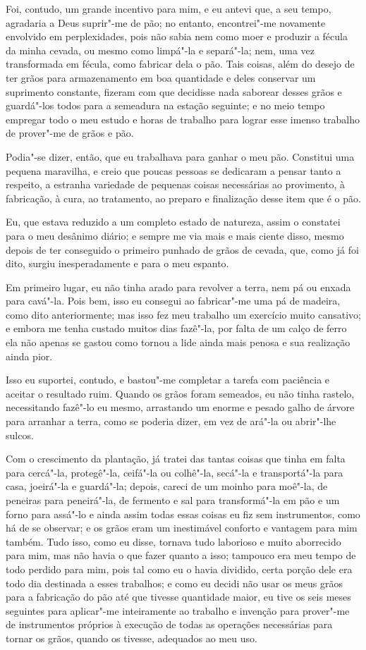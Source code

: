 Foi, contudo, um grande incentivo para mim, e eu antevi que, a seu
tempo, agradaria a Deus suprir"-me de pão; no entanto, encontrei"-me
novamente envolvido em perplexidades, pois não sabia nem como moer e
produzir a fécula da minha cevada, ou mesmo como limpá"-la e separá"-la;
nem, uma vez transformada em fécula, como fabricar dela o pão. Tais
coisas, além do desejo de ter grãos para armazenamento em boa quantidade
e deles conservar um suprimento constante, fizeram com que decidisse
nada saborear desses grãos e guardá"-los todos para a semeadura na
estação seguinte; e no meio tempo empregar todo o meu estudo e horas de
trabalho para lograr esse imenso trabalho de prover"-me de grãos e pão.

Podia"-se dizer, então, que eu trabalhava para ganhar o meu pão.
Constitui uma pequena maravilha, e creio que poucas pessoas se dedicaram
a pensar tanto a respeito, a estranha variedade de pequenas coisas
necessárias ao provimento, à fabricação, à cura, ao tratamento, ao
preparo e finalização desse item que é o pão.

Eu, que estava reduzido a um completo estado de natureza, assim o
constatei para o meu desânimo diário; e sempre me via mais e mais ciente
disso, mesmo depois de ter conseguido o primeiro punhado de grãos de
cevada, que, como já foi dito, surgiu inesperadamente e para o meu
espanto.

Em primeiro lugar, eu não tinha arado para revolver a terra, nem pá ou
enxada para cavá"-la. Pois bem, isso eu consegui ao fabricar"-me uma pá de
madeira, como dito anteriormente; mas isso fez meu trabalho um exercício
muito cansativo; e embora me tenha custado muitos dias fazê"-la, por
falta de um calço de ferro ela não apenas se gastou como tornou a lide
ainda mais penosa e sua realização ainda pior.

Isso eu suportei, contudo, e bastou"-me completar a tarefa com paciência
e aceitar o resultado ruim. Quando os grãos foram semeados, eu não tinha
rastelo, necessitando fazê"-lo eu mesmo, arrastando um enorme e pesado
galho de árvore para arranhar a terra, como se poderia dizer, em vez de
ará"-la ou abrir"-lhe sulcos.

Com o crescimento da plantação, já tratei das tantas coisas que tinha em
falta para cercá"-la, protegê"-la, ceifá"-la ou colhê"-la, secá"-la e
transportá"-la para casa, joeirá"-la e guardá"-la; depois, careci de um
moinho para moê"-la, de peneiras para peneirá"-la, de fermento e sal para
transformá"-la em pão e um forno para assá"-lo e ainda assim todas essas
coisas eu fiz sem instrumentos, como há de se observar; e os grãos eram
um inestimável conforto e vantagem para mim também. Tudo isso, como eu
disse, tornava tudo laborioso e muito aborrecido para mim, mas não havia
o que fazer quanto a isso; tampouco era meu tempo de todo perdido para
mim, pois tal como eu o havia dividido, certa porção dele era todo dia
destinada a esses trabalhos; e como eu decidi não usar os meus grãos
para a fabricação do pão até que tivesse quantidade maior, eu tive os
seis meses seguintes para aplicar"-me inteiramente ao trabalho e invenção
para prover"-me de instrumentos próprios à execução de todas as operações
necessárias para tornar os grãos, quando os tivesse, adequados ao meu
uso.

